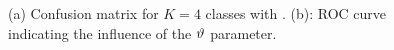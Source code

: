 \begin{figure}[h!]
\begin{adjustbox}{center}
\end{adjustbox}
\caption{(a) Confusion matrix for $K=4$ classes with \onlinepotato. 
(b): ROC curve indicating the influence of the $\vartheta$ parameter. %
}
\label{fig:cm-roc}
\end{figure}


